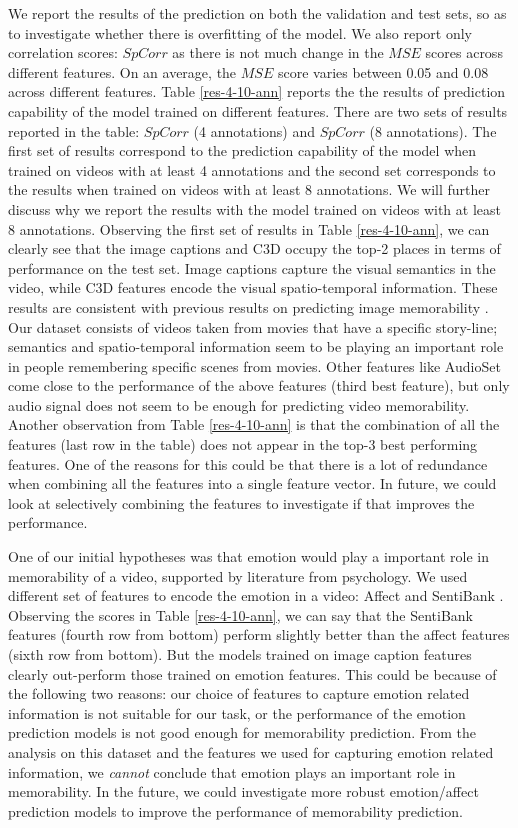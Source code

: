 \documentclass[sigconf]{acmart}
\begin{document}
We report the results of the prediction on both the validation and test sets, so as to investigate whether there is overfitting of the model.
We also report only correlation scores: $SpCorr$ as there is not much change in the $MSE$ scores across different features.
On an average, the $MSE$ score varies between 0.05 and 0.08 across different features.
Table \ref{res-4-10-ann} reports the the results of prediction capability of the model trained on different features.
There are two sets of results reported in the table: $SpCorr$ (4 annotations) and $SpCorr$ (8 annotations).
The first set of results correspond to the prediction capability of the model when trained on videos with at least 4 annotations and the second set corresponds to the results when trained on videos with at least 8 annotations.
We will further discuss why we report the results with the model trained on videos with at least 8 annotations.
Observing the first set of results in Table \ref{res-4-10-ann}, we can clearly see that the image captions and C3D occupy the top-2 places in terms of performance on the test set. 
Image captions capture the visual semantics in the video, while C3D features encode the visual spatio-temporal information.
These results are consistent with previous results on predicting image memorability \cite{squalli_2017_deep}.
Our dataset consists of videos taken from movies that have a specific story-line; semantics and spatio-temporal information seem to be playing an important role in people remembering specific scenes from movies.
Other features like AudioSet come close to the performance of the above features (third best feature), but only audio signal does not seem to be enough for predicting video memorability.
Another observation from Table \ref{res-4-10-ann} is that the combination of all the features (last row in the table) does not appear in the top-3 best performing features.
One of the reasons for this could be that there is a lot of redundance when combining all the features into a single feature vector.
In future, we could look at selectively combining the features to investigate if that improves the performance. 

One of our initial hypotheses was that emotion would play a important role in memorability of a video, supported by literature from psychology.
We used different set of features to encode the emotion in a video: Affect \cite{affect} and SentiBank \cite{sb-feat}.
Observing the scores in Table \ref{res-4-10-ann}, we can say that the SentiBank features (fourth row from bottom) perform slightly better than the affect features (sixth row from bottom).
But the models trained on image caption features clearly out-perform those trained on emotion features.
This could be because of the following two reasons: our choice of features to capture emotion related information is not suitable for our task, or the performance of the emotion prediction models is not good enough for memorability prediction.
From the analysis on this dataset and the features we used for capturing emotion related information, we \emph{cannot} conclude that emotion plays an important role in memorability.
In the future, we could investigate more robust emotion/affect prediction models to improve the performance of memorability prediction.
\end{document}
